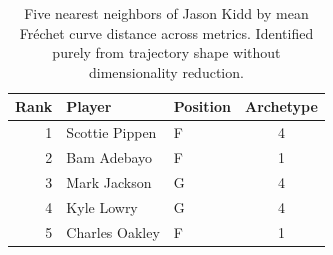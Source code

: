 \begin{table}[htbp]
  \centering\small
  \begin{tabular}{rllc}
    \toprule
    Rank & Player & Position & Archetype \\
    \midrule
    1 & Scottie Pippen & F & 4 \\
    2 & Bam Adebayo & F & 1 \\
    3 & Mark Jackson & G & 4 \\
    4 & Kyle Lowry & G & 4 \\
    5 & Charles Oakley & F & 1 \\
    \bottomrule
  \end{tabular}
  \caption{Five nearest neighbors of Jason Kidd by mean Fr\'{e}chet curve distance across metrics. Identified purely from trajectory shape without dimensionality reduction.}
  \label{tab:Jason_Kidd_frechet_curve_neighbors}
\end{table}

